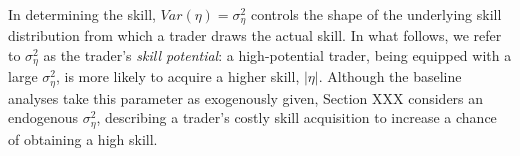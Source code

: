 \paragraph{} 
In determining the skill, $Var(\eta) = \sigma_{\eta}^2$  controls the shape of the underlying skill distribution from which a trader draws the actual skill. In what follows, we refer to $\sigma_{\eta}^2$ as the trader's \textit{skill potential}: a high-potential trader, being equipped with a large $\sigma_{\eta}^2$, is more likely to acquire a higher skill, $|\eta|$. Although the baseline analyses take this parameter as exogenously given, Section XXX considers an endogenous $\sigma_{\eta}^2$, describing a trader's costly skill acquisition to increase a chance of obtaining a high skill.